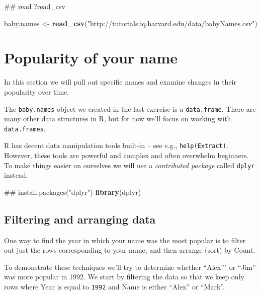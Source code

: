 \documentclass[]{book}
\newenvironment{Shaded}{\begin{snugshade}}{\end{snugshade}}
\newcommand{\KeywordTok}[1]{\textcolor[rgb]{0.13,0.29,0.53}{\textbf{#1}}}
\newcommand{\StringTok}[1]{\textcolor[rgb]{0.31,0.60,0.02}{#1}}
\newcommand{\NormalTok}[1]{#1}
\begin{document}
\begin{Shaded}
\begin{Highlighting}[]
\NormalTok{## read ?read_csv}
\end{Highlighting}
\end{Shaded}

\begin{Shaded}
\begin{Highlighting}[]
\NormalTok{baby.names <-}\StringTok{ }\KeywordTok{read_csv}\NormalTok{(}\StringTok{"http://tutorials.iq.harvard.edu/data/babyNames.csv"}\NormalTok{)}
\end{Highlighting}
\end{Shaded}

\chapter{Popularity of your name}\label{popularity-of-your-name}

In this section we will pull out specific names and examine changes in
their popularity over time.

The \texttt{baby.names} object we created in the last exercise is a
\texttt{data.frame}. There are many other data structures in R, but for
now we'll focus on working with \texttt{data.frames}.

R has decent data manipulation tools built-in -- see e.g.,
\texttt{help(Extract)}. However, these tools are powerful and complex
and often overwhelm beginners. To make things easier on ourselves we
will use a \emph{contributed package} called \texttt{dplyr} instead.

\begin{Shaded}
\begin{Highlighting}[]
\NormalTok{## install.packages("dplyr")}
\KeywordTok{library}\NormalTok{(dplyr)}
\end{Highlighting}
\end{Shaded}

\section{Filtering and arranging
data}\label{filtering-and-arranging-data}

One way to find the year in which your name was the most popular is to
filter out just the rows corresponding to your name, and then arrange
(sort) by Count.

To demonstrate these techniques we'll try to determine whether ``Alex''"
or ``Jim'' was more popular in 1992. We start by filtering the data so
that we keep only rows where Year is equal to \texttt{1992} and Name is
either ``Alex'' or ``Mark''.
\end{document}
